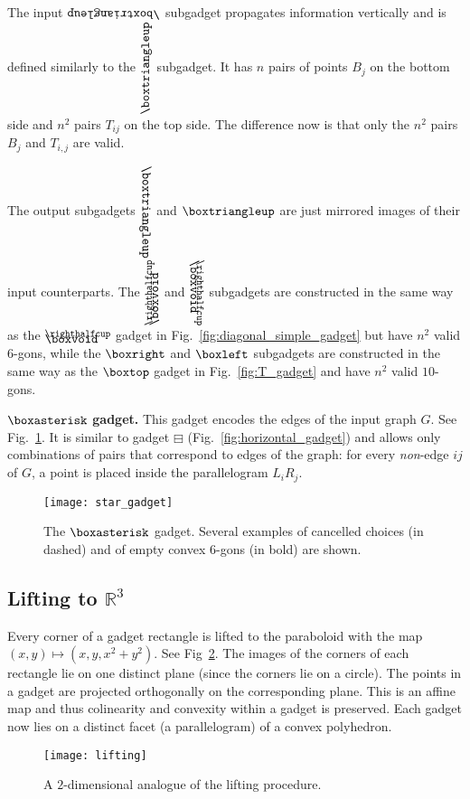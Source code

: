 \documentclass[11pt,a4paper]{article}
\let\boxminusnew\boxminus
\newcommand*{\boxangle}{\mathrel{
\vcenter{\offinterlineskip
\hbox{\scalebox{.76}[0.85]{$\righthalfcup$}}\vskip-.9ex\hbox{$\boxvoid$}}}}
\newcommand{\boxanglerota}{\rotatebox[origin=c]{90}{$\boxangle$}}
\newcommand{\boxanglerotb}{\rotatebox[origin=c]{270}{$\boxangle$}}
\newcommand{\boxtriangledown}{\rotatebox[origin=c]{180}{$\boxtriangleup$}}
\newcommand{\boxtriangleright}{\rotatebox[origin=c]{270}{$\boxtriangleup$}}
\newcommand{\boxtriangleleft}{\rotatebox[origin=c]{90}{$\boxtriangleup$}}
\begin{document}
The input $\boxtriangledown$ subgadget propagates information vertically and is defined similarly to the $\boxtriangleleft$ subgadget. It has $n$ pairs of points $B_j$ on the bottom side and $n^2$ pairs $T_{ij}$ on the top side. The difference now is that only the $n^2$ pairs $B_j$ and $T_{i,j}$ are valid.



The output subgadgets $\boxtriangleright$ and $\boxtriangleup$ are just mirrored images of their input counterparts. The $\boxanglerota$ and $\boxanglerotb$ subgadgets are constructed in the same way as the $\boxangle$ gadget in Fig.~\ref{fig:diagonal_simple_gadget} but have $n^2$ valid $6$-gons, while the $\boxright$ and $\boxleft$ subgadgets are constructed in the same way as the $\boxtop$ gadget in Fig.~\ref{fig:T_gadget} and have $n^2$ valid $10$-gons. 

\medskip
\noindent
{$\boxasterisk$ \textbf{gadget.}} This gadget encodes the edges of the input graph $G$. See Fig.~\ref{fig:star_gadget}. It is similar to gadget $\boxminusnew$ (Fig.~\ref{fig:horizontal_gadget}) and allows only combinations of pairs that correspond to edges of the graph: for every \emph{non}-edge $ij$ of $G$, a point is placed inside the parallelogram $L_iR_j$. 


\begin{figure}[h]
\centering
	\texttt{[image: star\_gadget]}
	\caption{The $\boxasterisk$ gadget. Several examples of cancelled choices (in dashed) and of empty convex $6$-gons (in bold) are shown.}
	\label{fig:star_gadget}
\end{figure}

\subsection{Lifting to $\mathbb{R}^3$}
Every corner of a gadget rectangle is lifted to the paraboloid with the map $(x, y) \mapsto (x ,y , x^2+y^2)$. See Fig~\ref{fig:lifting}. The images of the corners of each rectangle lie on one distinct plane (since the corners lie on a circle). The points in a gadget are projected orthogonally on the corresponding plane. This is an affine map and thus colinearity and convexity within a gadget is preserved. Each gadget now lies on a distinct facet (a parallelogram) of a convex polyhedron.

\begin{figure}[h]
\centering
	\texttt{[image: lifting]}
	\caption{A $2$-dimensional analogue of the lifting procedure.}
	\label{fig:lifting}
\end{figure}
\end{document}
